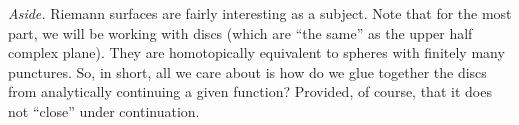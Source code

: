 \medskip
\noindent\textit{Aside.\enspace} Riemann surfaces are fairly
interesting as a subject. Note that for the most part, we will be
working with discs (which are ``the same'' as the upper half
complex plane). They are homotopically equivalent to spheres with
finitely many punctures. So, in short, all we care about is how
do we glue together the discs from analytically continuing a
given function? Provided, of course, that it does not ``close''
under continuation.
